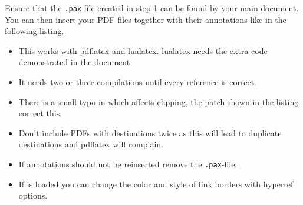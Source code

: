 \documentclass[DIV=12,parskip=half-,bibliography=totoc]{scrartcl}
\begin{document}
Ensure that the \texttt{.pax} file created in step 1 can be found by your main document. You can then insert your PDF files together with their annotations like in the following listing.

\begin{itemize}
\item This works with pdflatex and lualatex. lualatex needs the extra code demonstrated in the document.
\item It needs two or three compilations until every reference is correct.
\item There is a small typo in  which affects clipping, the patch shown in the listing correct this.
\item Don't include PDFs with destinations twice as this will lead to duplicate destinations and pdflatex will complain.
\item If annotations should not be reinserted remove the \texttt{.pax}-file.
\item If  is loaded you can change the color and style of link borders with hyperref options.
\end{itemize}


 
\end{document}
